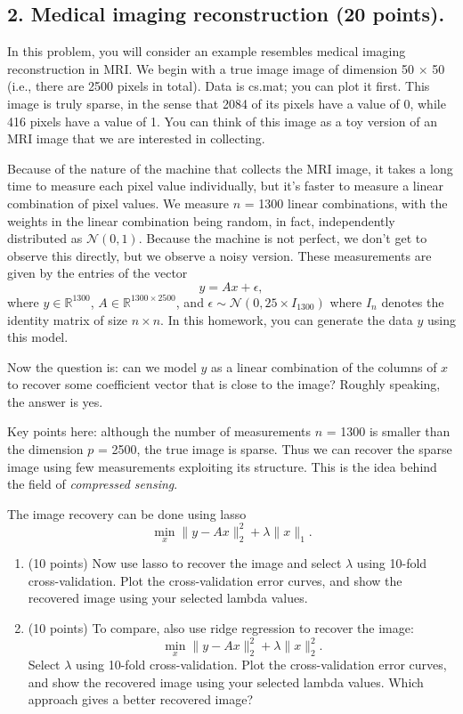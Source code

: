 \documentclass[twoside,10pt]{article}
\begin{document}
\subsection*{2. Medical imaging reconstruction (20 points).} 

In this problem, you will consider an example resembles medical imaging reconstruction in MRI.  We begin with a true image image of dimension 50 $\times$ 50 (i.e., there are 2500 pixels in total). Data is \textsf{cs.mat}; you can plot it first. This image is truly sparse, in the sense that 2084 of its pixels have a value of 0, while 416 pixels have a value of 1. You can think of this image as a toy version of an MRI image that we are interested in collecting.

Because of the nature of the machine that collects the MRI image, it takes a long time to measure each pixel value individually, but it's faster to measure a linear combination of pixel values. We measure $n$ = 1300 linear combinations, with the weights in the linear combination being random, in fact, independently distributed as $\mathcal{N}(0,1)$. Because the machine is not perfect, we don't get to observe this directly, but we observe a noisy version. These measurements are given by the entries of the vector
\[
y = A x + \epsilon,
\]
where $y \in \mathbb R^{1300}$, $A \in \mathbb R^{1300\times 2500}$, and $\epsilon \sim \mathcal N(0, 25\times I_{1300})$ where $I_n$ denotes the identity matrix of size $n\times n$. In this homework, you can generate the data $y$ using this model. 

Now the question is: can we model $y$ as a linear combination of the columns of $x$ to recover some coefficient vector that is close to the image? Roughly speaking, the answer is yes. 

Key points here: although the number of measurements $n$ = 1300 is smaller than the dimension $p$ = 2500, the true image is sparse. Thus we can recover the sparse image using few measurements exploiting its structure. This is the idea behind the field of \textit{compressed sensing}. 

The image recovery can be done using lasso
\[
\min_x \|y-Ax\|_2^2 + \lambda \|x\|_1.
\]
\begin{enumerate}
\item (10 points) Now use lasso to recover the image and select $\lambda$ using 10-fold cross-validation. Plot the cross-validation error curves, and show the recovered image using your selected lambda values.

\item (10 points) To compare, also use ridge regression to recover the image:
\[
\min_x \|y-Ax\|_2^2 + \lambda \|x\|_2^2.
\]
Select $\lambda$ using 10-fold cross-validation. Plot the cross-validation error curves, and show the recovered image using your selected lambda values. Which approach gives a better recovered image?
\end{enumerate}
\end{document}
